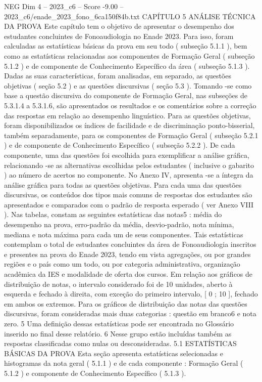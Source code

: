 \begin{textsample}{NEG Dim 4 – 2023\_c6 – Score -9.00 – 2023\_c6/enade\_2023\_fono\_6ca150f84b.txt}  \label{ex:f4_neg_009}
CAPÍTULO 5 ANÁLISE TÉCNICA DA PROVA Este capítulo tem o objetivo de apresentar o desempenho dos estudantes concluintes de Fonoaudiologia no Enade 2023.
Para isso, foram calculadas as estatísticas básicas da prova em seu todo ( subseção 5.1.1 ), bem como as estatísticas relacionadas aos componentes de Formação Geral ( subseção 5.1.2 ) e de componente de Conhecimento Específico da área ( subseção 5.1.3 ).
Dadas as suas características, foram analisadas, em separado, as questões objetivas ( seção 5.2 ) e as questões discursivas ( seção 5.3 ).
Tomando -se como base a questão discursiva do componente de Formação Geral, nas subseções de 5.3.1.4 a 5.3.1.6, são apresentados os resultados e os comentários sobre a correção das respostas em relação ao desempenho linguístico.
Para as questões objetivas, foram disponibilizados os índices de facilidade e de discriminação ponto-bisserial, também separadamente, para os componentes de Formação Geral ( subseção 5.2.1 ) e de componente de Conhecimento Específico ( subseção 5.2.2 ).
De cada componente, uma das questões foi escolhida para exemplificar a análise gráfica, relacionando -se as alternativas escolhidas pelos estudantes ( inclusive o gabarito ) ao número de acertos no componente.
No Anexo IV, apresenta -se a íntegra da análise gráfica para todas as questões objetivas.
Para cada uma das questões discursivas, os conteúdos dos tipos mais comuns de respostas dos estudantes são apresentados e comparados com o padrão de resposta esperado ( ver Anexo VIII ).
Nas tabelas, constam as seguintes estatísticas das notas5 : média do desempenho na prova, erro-padrão da média, desvio-padrão, nota mínima, mediana e nota máxima para cada um de seus componentes.
Tais estatísticas contemplam o total de estudantes concluintes da área de Fonoaudiologia inscritos e presentes na prova do Enade 2023, tendo em vista agregações, ou por grandes regiões e o país como um todo, ou por categoria administrativa, organização acadêmica da IES e modalidade de oferta dos cursos.
Em relação aos gráficos de distribuição de notas, o intervalo considerado foi de 10 unidades, aberto à esquerda e fechado à direita, com exceção do primeiro intervalo, [ 0 ; 10 ], fechado em ambos os extremos.
Para os gráficos de distribuição das notas das questões discursivas, foram consideradas mais duas categorias : questão em branco6 e nota zero. 5 Uma definição dessas estatísticas pode ser encontrada no Glossário inserido no final desse relatório. 6 Nesse grupo estão incluídas também as respostas classificadas como nulas ou desconsideradas. 5.1 ESTATÍSTICAS BÁSICAS DA PROVA Esta seção apresenta estatísticas selecionadas e histogramas da nota geral ( 5.1.1 ) e de cada componente : Formação Geral ( 5.1.2 ) e componente de Conhecimento Específico ( 5.1.3 ).

\end{textsample}
